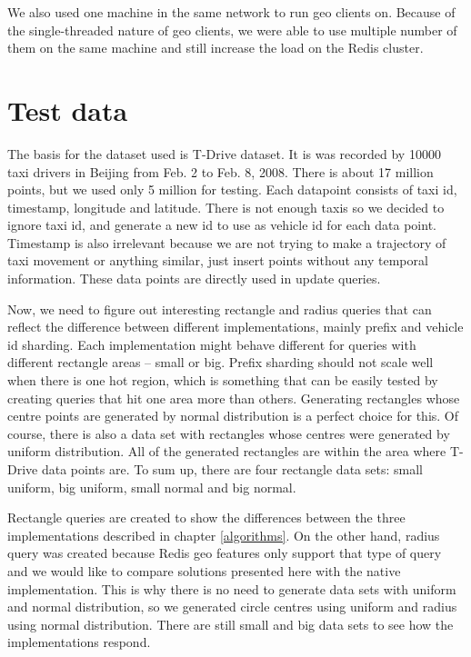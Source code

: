 \documentclass[times, utf8, diplomski]{fer}
\begin{document}
We also used one machine in the same network to run geo clients on. Because of the single-threaded nature of geo clients, we were able to use multiple number of them on the same machine and still increase the load on the Redis cluster.

\section {Test data} \label{test}
The basis for the dataset used is T-Drive \citet{tdrive1, tdrive2} dataset. It is was recorded by 10000 taxi drivers in Beijing from Feb. 2 to Feb. 8, 2008. There is about 17 million points, but we used only 5 million for testing. Each datapoint consists of taxi id, timestamp, longitude and latitude. There is not enough taxis so we decided to ignore taxi id, and generate a new id to use as vehicle id for each data point. Timestamp is also irrelevant because we are not trying to make a trajectory of taxi movement or anything similar, just insert points without any temporal information. These data points are directly used in update queries.

Now, we need to figure out interesting rectangle and radius queries that can reflect the difference between different implementations, mainly prefix and vehicle id sharding. Each implementation might behave different for queries with different rectangle areas -- small or big. Prefix sharding should not scale well when there is one hot region, which is something that can be easily tested by creating queries that hit one area more than others. Generating rectangles whose centre points are generated by normal distribution is a perfect choice for this. Of course, there is also a data set with rectangles whose centres were generated by uniform distribution. All of the generated rectangles are within the area where T-Drive data points are. To sum up, there are four rectangle data sets: small uniform, big uniform, small normal and big normal.

Rectangle queries are created to show the differences between the three implementations described in chapter \ref{algorithms}. On the other hand, radius query was created because Redis geo features only support that type of query and we would like to compare solutions presented here with the native implementation. This is why there is no need to generate data sets with uniform and normal distribution, so we generated circle centres using uniform and radius using normal distribution. There are still small and big data sets to see how the implementations respond.
\end{document}
